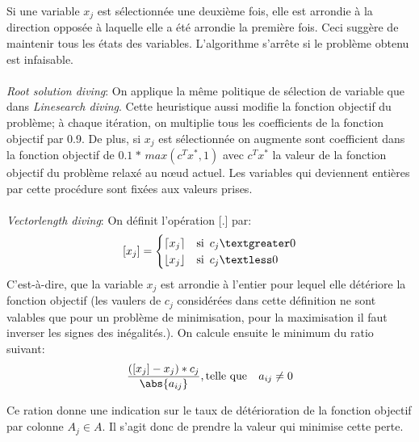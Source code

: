\documentclass[12pt,a4paper,oneside]{book}
\theoremstyle{definition}
\DeclarePairedDelimiter\ceil{\lceil}{\rceil}
\DeclarePairedDelimiter\floor{\lfloor}{\rfloor}
\begin{document}
	Si une variable $x_j$ est sélectionnée une deuxième fois, elle est arrondie à la direction opposée à laquelle elle a été arrondie la première fois. Ceci suggère de maintenir tous les états des variables. L'algorithme s'arrête si le problème obtenu est infaisable.
	 
	
	\paragraph{}
	\textit{Root solution diving}: On applique la même politique de sélection de variable que dans \textit{Linesearch diving}. Cette heuristique aussi modifie la fonction objectif du problème; à chaque itération, on multiplie tous les coefficients de la fonction objectif par 0.9. De plus, si $x_j$ est sélectionnée on augmente sont coefficient dans la fonction objectif de $0.1 \hspace{1pt}  * \hspace{2pt} max(c^Tx^*,1)$ avec $c^Tx^*$ la valeur de la fonction objectif du problème relaxé au nœud actuel. Les variables qui deviennent entières par cette procédure sont fixées aux valeurs prises.
	
	
	\paragraph{}
	\textit{Vectorlength diving}: On définit l'opération [.] par: 
	\[
		[x_j] = \begin{cases}
			\ceil{x_j} & \text{si} \hspace{5pt} c_j \textgreater 0 \\
			\floor{x_j} &  \text{si} \hspace{5pt} c_j \textless 0
		\end{cases}
	\]
	C'est-à-dire, que la variable $x_j$ est arrondie à l'entier pour lequel elle détériore la fonction objectif (les vaulers de $c_j$ considérées dans cette définition ne sont valables que pour un problème de minimisation, pour la maximisation il faut inverser les signes des inégalités.).
	On calcule ensuite le minimum du ratio suivant:
	\[
		\frac{([x_j] - x_j)*c_j}{\abs{a_{ij}}} , \text{telle que } \hspace{7pt} a_{ij} \neq 0
	\]
	
	Ce ration donne une indication sur le taux de détérioration de la fonction objectif par colonne $A_j \in A$. Il s'agit donc de prendre la valeur qui minimise cette perte.
	
	
	
\end{document}
